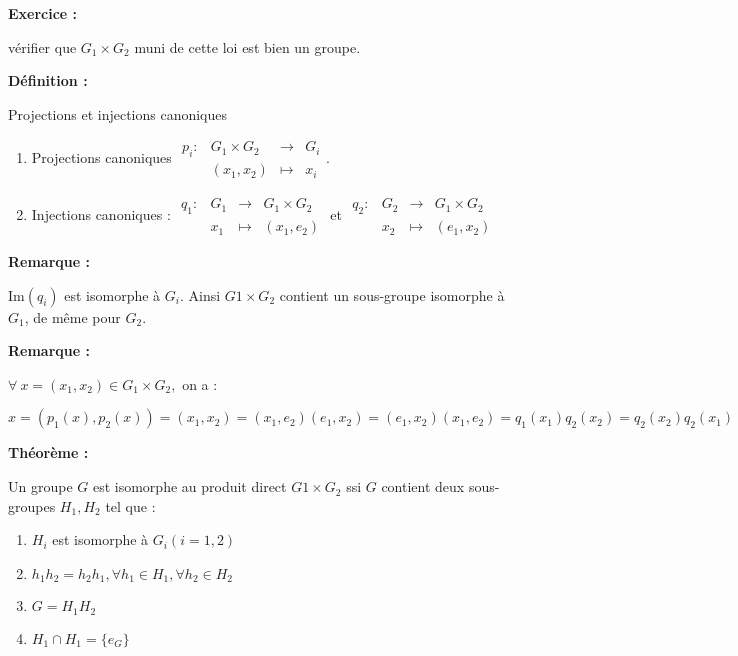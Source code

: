 \documentclass{report}
\newenvironment{definition}[1][]{
    \begin{tcolorbox}[colframe= white]
    \textbf{Définition :} 
    #1 \par
    }
    {\end{tcolorbox}}
\newenvironment{exo}{\begin{tcolorbox}[colframe= white]
    \textbf{Exercice :}
    \par}
    {\end{tcolorbox}}
\newenvironment{theoreme}[1][]{
    \begin{tcolorbox}[]
    \textbf{Théorème :} #1  \par} 
    {\end{tcolorbox}}
\newcommand{\remarque}{
    \noindent\textbf{Remarque :} \par
}
\newcommand{\im}[0]{\textrm{Im}}
\newcommand{\fonction}[5]{
    \begin{array}{l|rcl}
    #1: & #2 & \longrightarrow & #3 \\
        & #4 & \longmapsto & #5 
    \end{array}
}
\begin{document}
\begin{exo}
    vérifier que $G_1 \times G_2$ muni de cette loi est bien un groupe.
\end{exo}
\begin{definition}{Projections et injections canoniques}
\begin{enumerate}
    \item Projections canoniques $\fonction{p_i}{G_1 \times G_2}{G_i}{(x_1 ,x_2)}{x_i}$.
    \item Injections canoniques : $\fonction{q_1}{G_1}{G_1 \times G_2}{x_1}{(x_1 ,e_2)}$ et $\fonction{q_2}{G_2}{G_1 \times G_2}{x_2}{(e_1 ,x_2)}$
\end{enumerate}
\end{definition}

\remarque{$\im (q_i)$ est isomorphe à $G_i$. Ainsi $G1 \times G_2$ contient un sous-groupe isomorphe à $G_1$, de même pour $G_2$.}
    


\remarque{
$\forall ~x = (x_1 ,x_2) \in G_1 \times G_2,$ on a :\par
    $x = (p_1 (x), p_2 (x)) = (x_1 ,x_2) = (x_1 ,e_2)(e_1 ,x_2) = (e_1 ,x_2)(x_1 ,e_2) = q_1 (x_1)q_2 (x_2) = q_2(x_2)q_2(x_1)$}
    

\begin{theoreme}
    Un groupe $G$ est isomorphe au produit direct $G1 \times G_2$ ssi $G$ contient deux sous-groupes $H_1,H_2$ tel que :
    \begin{enumerate}
        \item $H_i$ est isomorphe à $G_i (i = 1,2)$
        \item $h_1 h_2 = h_2 h_1, \forall h_1\in H_1, \forall h_2\in H_2$
        \item $G = H_1 H_2$
        \item $H_1 \cap H_1 = \{e_G\}$
    \end{enumerate}
\end{theoreme}
\end{document}
